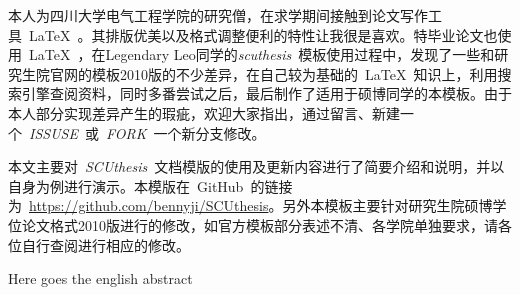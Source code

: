
\begin{CHSabstract}
	本人为四川大学电气工程学院的研究僧，在求学期间接触到论文写作工具~\LaTeX~。其排版优美以及格式调整便利的特性让我很是喜欢。特毕业论文也使用~\LaTeX~，在Legendary Leo同学的\emph{scuthesis}~模板使用过程中，发现了一些和研究生院官网的模板2010版的不少差异，在自己较为基础的~\LaTeX~知识上，利用搜索引擎查阅资料，同时多番尝试之后，最后制作了适用于硕博同学的本模板。由于本人部分实现差异产生的瑕疵，欢迎大家指出，通过留言、新建一个~\emph{ISSUSE}~或~\emph{FORK}~一个新分支修改。
	
	本文主要对~\emph{SCUthesis}~文档模版的使用及更新内容进行了简要介绍和说明，并以自身为例进行演示。本模版在~GitHub~的链接为~\url{https://github.com/bennyji/SCUthesis}。另外本模板主要针对研究生院硕博学位论文格式2010版进行的修改，如官方模板部分表述不清、各学院单独要求，请各位自行查阅进行相应的修改。
\end{CHSabstract}
\begin{ENGabstract}
	Here goes the english abstract
\end{ENGabstract}
